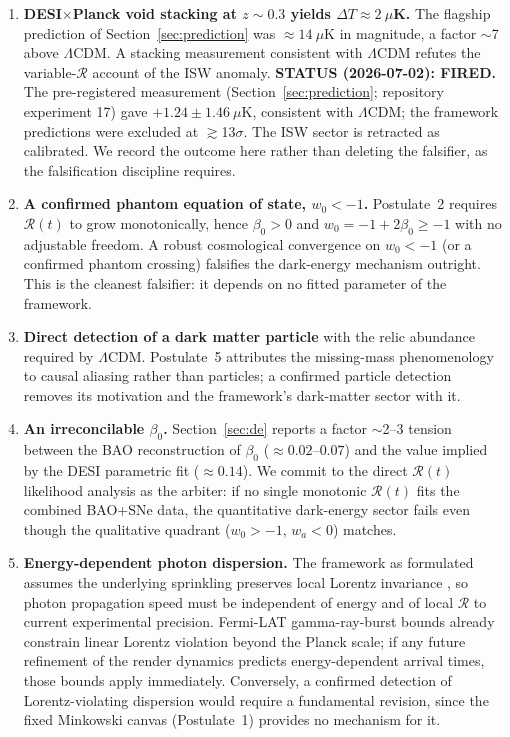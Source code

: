 \documentclass[12pt]{article}
\begin{document}
\begin{enumerate}
\item {\bf DESI$\times$Planck void stacking at $z\sim0.3$ yields $\Delta T \approx 2\ \mu$K.} The flagship prediction of Section~\ref{sec:prediction} was $\approx14\ \mu$K in magnitude, a factor $\sim$7 above $\Lambda$CDM. A stacking measurement consistent with $\Lambda$CDM refutes the variable-$\mathcal{R}$ account of the ISW anomaly. {\bf STATUS (2026-07-02): FIRED.} The pre-registered measurement (Section~\ref{sec:prediction}; repository experiment 17) gave $+1.24\pm1.46\ \mu$K, consistent with $\Lambda$CDM; the framework predictions were excluded at $\gtrsim$13$\sigma$. The ISW sector is retracted as calibrated. We record the outcome here rather than deleting the falsifier, as the falsification discipline requires.
\item {\bf A confirmed phantom equation of state, $w_0 < -1$.} Postulate~2 requires $\mathcal{R}(t)$ to grow monotonically, hence $\beta_0 > 0$ and $w_0 = -1 + 2\beta_0 \geq -1$ with no adjustable freedom. A robust cosmological convergence on $w_0 < -1$ (or a confirmed phantom crossing) falsifies the dark-energy mechanism outright. This is the cleanest falsifier: it depends on no fitted parameter of the framework.
\item {\bf Direct detection of a dark matter particle} with the relic abundance required by $\Lambda$CDM. Postulate~5 attributes the missing-mass phenomenology to causal aliasing rather than particles; a confirmed particle detection removes its motivation and the framework's dark-matter sector with it.
\item {\bf An irreconcilable $\beta_0$.} Section~\ref{sec:de} reports a factor $\sim$2--3 tension between the BAO reconstruction of $\beta_0$ ($\approx0.02$--$0.07$) and the value implied by the DESI parametric fit ($\approx0.14$). We commit to the direct $\mathcal{R}(t)$ likelihood analysis as the arbiter: if no single monotonic $\mathcal{R}(t)$ fits the combined BAO+SNe data, the quantitative dark-energy sector fails even though the qualitative quadrant ($w_0>-1$, $w_a<0$) matches.
\item {\bf Energy-dependent photon dispersion.} The framework as formulated assumes the underlying sprinkling preserves local Lorentz invariance \citep{bombelli1987}, so photon propagation speed must be independent of energy and of local $\mathcal{R}$ to current experimental precision. Fermi-LAT gamma-ray-burst bounds already constrain linear Lorentz violation beyond the Planck scale; if any future refinement of the render dynamics predicts energy-dependent arrival times, those bounds apply immediately. Conversely, a confirmed detection of Lorentz-violating dispersion would require a fundamental revision, since the fixed Minkowski canvas (Postulate~1) provides no mechanism for it.
\end{enumerate}
\end{document}
